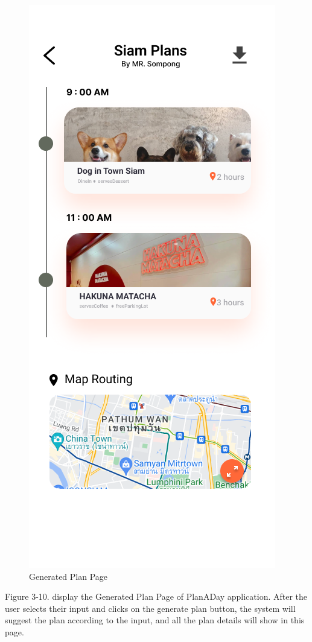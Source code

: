 \newpage
\begin{figure}[!h]
    \centering
    \includegraphics[width=0.5\linewidth]{chapter3/UI_Other_plan.png}
    \caption{Generated Plan Page}
    \label{fig:Generated Plan Page}
\end{figure}
\noindent
Figure 3-10. display the Generated Plan Page of PlanADay application. After the
user selects their input and clicks on the generate plan button, the system will
suggest the plan according to the input, and all the plan details will show in this
page.

